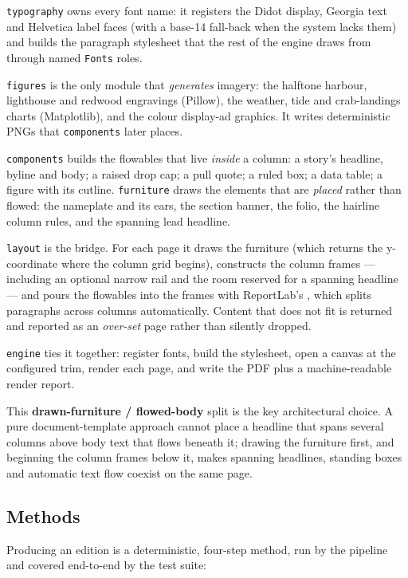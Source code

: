 \documentclass[
  english,
]{article}
\begin{document}
\texttt{typography} owns every font name: it registers the Didot
display, Georgia text and Helvetica label faces (with a base-14
fall-back when the system lacks them) and builds the paragraph
stylesheet that the rest of the engine draws from through named
\texttt{Fonts} roles.

\texttt{figures} is the only module that \emph{generates} imagery: the
halftone harbour, lighthouse and redwood engravings (Pillow), the
weather, tide and crab-landings charts (Matplotlib), and the colour
display-ad graphics. It writes deterministic PNGs that
\texttt{components} later places.

\texttt{components} builds the flowables that live \emph{inside} a
column: a story's headline, byline and body; a raised drop cap; a pull
quote; a ruled box; a data table; a figure with its cutline.
\texttt{furniture} draws the elements that are \emph{placed} rather than
flowed: the nameplate and its ears, the section banner, the folio, the
hairline column rules, and the spanning lead headline.

\texttt{layout} is the bridge. For each page it draws the furniture
(which returns the y-coordinate where the column grid begins),
constructs the column frames --- including an optional narrow rail and
the room reserved for a spanning headline --- and pours the flowables
into the frames with ReportLab's , which
splits paragraphs across columns automatically. Content that does not
fit is returned and reported as an \emph{over-set} page rather than
silently dropped.

\texttt{engine} ties it together: register fonts, build the stylesheet,
open a canvas at the configured trim, render each page, and write the
PDF plus a machine-readable render report.

This \textbf{drawn-furniture / flowed-body} split is the key
architectural choice. A pure document-template approach cannot place a
headline that spans several columns above body text that flows beneath
it; drawing the furniture first, and beginning the column frames below
it, makes spanning headlines, standing boxes and automatic text flow
coexist on the same page.

\subsection{Methods}\label{methods}

Producing an edition is a deterministic, four-step method, run by the
pipeline and covered end-to-end by the test suite:
\end{document}
